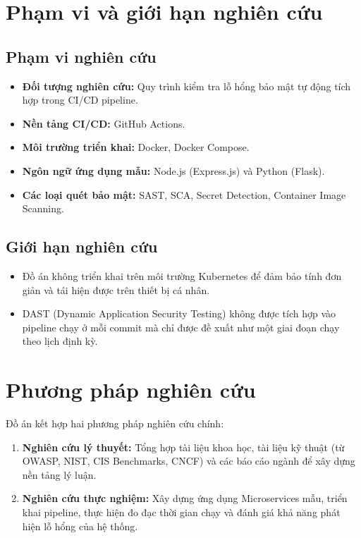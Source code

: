 \documentclass[12pt,a4paper]{report}
\begin{document}
\section{Phạm vi và giới hạn nghiên cứu}

\subsection{Phạm vi nghiên cứu}
\begin{itemize}[leftmargin=2cm]
    \item \textbf{Đối tượng nghiên cứu:} Quy trình kiểm tra lỗ hổng bảo mật tự động tích hợp trong CI/CD pipeline.
    \item \textbf{Nền tảng CI/CD:} GitHub Actions.
    \item \textbf{Môi trường triển khai:} Docker, Docker Compose.
    \item \textbf{Ngôn ngữ ứng dụng mẫu:} Node.js (Express.js) và Python (Flask).
    \item \textbf{Các loại quét bảo mật:} SAST, SCA, Secret Detection, Container Image Scanning.
\end{itemize}

\subsection{Giới hạn nghiên cứu}
\begin{itemize}[leftmargin=2cm]
    \item Đồ án không triển khai trên môi trường Kubernetes để đảm bảo tính đơn giản và tái hiện được trên thiết bị cá nhân.
    \item DAST (Dynamic Application Security Testing) không được tích hợp vào pipeline chạy ở mỗi commit mà chỉ được đề xuất như một giai đoạn chạy theo lịch định kỳ.
\end{itemize}

\section{Phương pháp nghiên cứu}

Đồ án kết hợp hai phương pháp nghiên cứu chính:
\begin{enumerate}[leftmargin=2cm]
    \item \textbf{Nghiên cứu lý thuyết:} Tổng hợp tài liệu khoa học, tài liệu kỹ thuật (từ OWASP, NIST, CIS Benchmarks, CNCF) và các báo cáo ngành để xây dựng nền tảng lý luận.
    \item \textbf{Nghiên cứu thực nghiệm:} Xây dựng ứng dụng Microservices mẫu, triển khai pipeline, thực hiện đo đạc thời gian chạy và đánh giá khả năng phát hiện lỗ hổng của hệ thống.
\end{enumerate}
\end{document}
